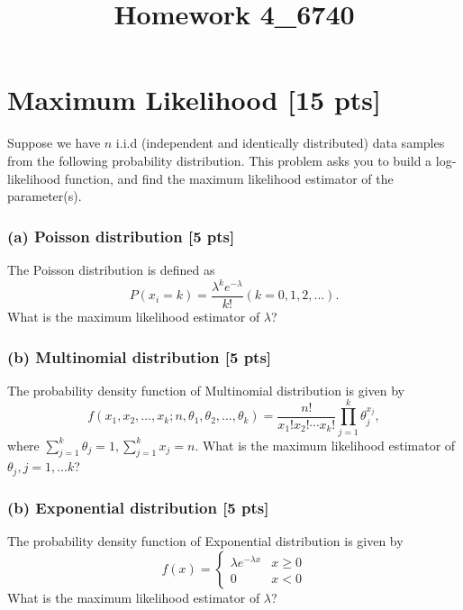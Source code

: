 \documentclass[12pt]{article}
\title{Homework 4_6740}
\begin{document}
\MakeScribeTop
\section{Maximum Likelihood [15 pts]}

Suppose we have $n$ i.i.d (independent and identically distributed)
data samples from the following probability distribution. This
problem asks you to build a log-likelihood function, and find the
maximum likelihood estimator of the parameter(s).

\subsubsection*{(a) Poisson distribution [5 pts]}
The Poisson distribution is defined as
\begin{equation} \nonumber
P(x_i = k) = \frac{\lambda^k e^{-\lambda}}{k!} (k = 0, 1, 2, ...).
\end{equation}
What is the maximum likelihood estimator of $\lambda$?

\subsubsection*{(b) Multinomial distribution [5 pts]}
The probability density function of Multinomial distribution is given by 
$$f(x_1,x_2,\dots,x_k;n,\theta_1,\theta_2,\dots,\theta_k)=\frac{n!}{x_1!x_2!\cdots x_k!}\prod_{j=1}^{k}\theta_j^{x_j},$$
where $\sum_{j=1}^k\theta_j=1,\sum_{j=1}^k x_j=n$. What is the maximum likelihood estimator of $\theta_j, j=1,\dots k$?

\subsubsection*{(b) Exponential distribution [5 pts]}
The probability density function of Exponential distribution is
given by
\begin{equation} \nonumber
f(x) = \left\{\begin{matrix}
\lambda e^{-\lambda x} & x \ge 0\\
0 & x < 0
\end{matrix}\right.
\end{equation}
What is the maximum likelihood estimator of $\lambda$?
\end{document}
